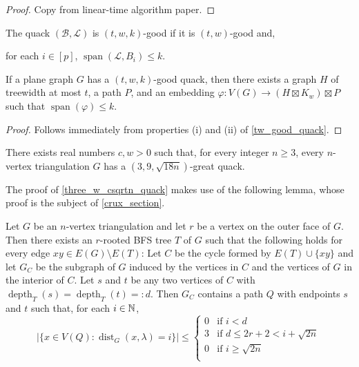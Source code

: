 \documentclass{patmorin}
\newcommand{\defin}[1]{\emph{\textcolor{brightmaroon}{#1}}}
\DeclareMathOperator{\spn}{span}
\DeclareMathOperator{\dist}{dist}
\DeclareMathOperator{\depth}{depth}
\begin{document}
\begin{proof}
  Copy from linear-time algorithm paper.
\end{proof}

The quack $(\mathcal{B},\mathcal{L})$ is $(t,w,k)$-good if it is $(t,w)$-good and,
\begin{compactenum}[({good-}a)]\setcounter{enumi}{18}
  \item for each $i\in[p]$, $\spn(\mathcal{L},B_i)\le k$.
\end{compactenum}

\begin{lem}
  If a plane graph $G$ has a $(t,w,k)$-good quack, then there exists a graph $H$ of treewidth at most $t$, a path $P$, and an embedding $\varphi:V(G)\to (H\boxtimes K_w)\boxtimes P$ such that $\spn(\varphi)\le k$.
\end{lem}

\begin{proof}
  Follows immediately from properties (i) and (ii) of \cref{tw_good_quack}.
\end{proof}






\begin{thm}\label{three_w_csqrtn_quack}
  There exists real numbers $c,w>0$ such that, for every integer $n\ge 3$, every $n$-vertex triangulation $G$ has a $(3,9,\sqrt{18n})$-great quack.
\end{thm}


The proof of \cref{three_w_csqrtn_quack} makes use of the following lemma, whose proof is the subject of \cref{crux_section}.

\begin{lem}\label{awesome_path}
  Let $G$ be an $n$-vertex triangulation and let $r$ be a vertex on the outer face of $G$.  Then there exists an $r$-rooted BFS tree $T$ of $G$ such that the following holds for every edge $xy\in E(G)\setminus E(T)$: Let $C$ be the cycle formed by $E(T)\cup\{xy\}$ and let $G_{C}$ be the subgraph of $G$ induced by the vertices in $C$ and the vertices of $G$ in the interior of $C$.  Let $s$ and $t$ be any two vertices of $C$ with $\depth_T(s)=\depth_T(t)=:d$.  Then $G_C$ contains a path $Q$ with endpoints $s$ and $t$ such that, for each $i\in\mathbb{N}$,
    \[  |\{x\in V(Q):\dist_G(x,\lambda)=i\}| \le
      \begin{cases}
        0 & \text{if $i < d$} \\
        3 & \text{if $d\le 2r+2 < i+\sqrt{2n}$} \\
        0 & \text{if $i \ge \sqrt{2n}$} \\
      \end{cases}
    \]
\end{lem}
\end{document}
